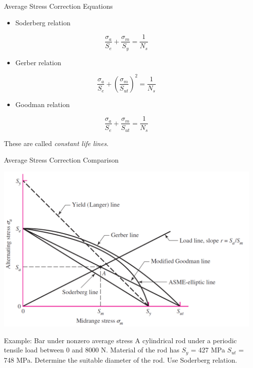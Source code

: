 \documentclass[10pt, svgnames]{beamer}
\begin{document}
\begin{frame}[label={sec:orgb34f063}]{Average Stress Correction Equations}
\begin{itemize}
\item Soderberg relation
\end{itemize}
$$ \dfrac{\sigma_a}{S_e} + \dfrac{\sigma_m}{S_y} = \dfrac{1}{N_s} $$
\begin{itemize}
\item Gerber relation
\end{itemize}
$$ \dfrac{\sigma_a}{S_e} + \left( \dfrac{\sigma_m}{S_{ut}} \right)^2 = \dfrac{1}{N_s} $$
\begin{itemize}
\item Goodman relation
\end{itemize}
$$ \dfrac{\sigma_a}{S_e} + \dfrac{\sigma_m}{S_{ut}} = \dfrac{1}{N_s} $$

These are called \emph{constant life lines}.
\end{frame}


\begin{frame}[label={sec:org65b9f8b}]{Average Stress Correction Comparison}
\begin{center}
\includegraphics[width=.9\linewidth]{pictures/stresscorrection.pdf}
\end{center}
\end{frame}


\begin{frame}[label={sec:org2e392df}]{Example: Bar under nonzero average stress}
A cylindrical rod under a periodic tensile load between 0 and 8000 N. Material of the rod has \(S_y\) = 427 MPa  \(S_{ut}\) = 748 MPa. Determine the suitable diameter of the rod. Use Soderberg relation.

\end{frame}
\end{document}

